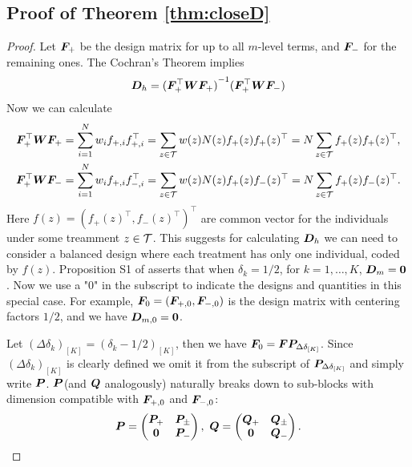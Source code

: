 \documentclass[12pt]{article}
\begin{document}
\subsection{Proof of Theorem \ref{thm:closeD}}
\begin{proof}
Let ${\boldsymbol{F}}_+$ be the design matrix for up to all $m$-level terms, and ${\boldsymbol{F}}_-$ for the remaining ones.  The Cochran's Theorem implies 
\begin{align*}
    {\boldsymbol{D}}_h = {({\boldsymbol{F}}_+^\top {\boldsymbol{W}} {\boldsymbol{F}}_+)}^{-1}({\boldsymbol{F}}_+^\top {\boldsymbol{W}} {\boldsymbol{F}}_-)
\end{align*}
Now we can calculate
\begin{align*}
    {\boldsymbol{F}}_+^\top {\boldsymbol{W}} {\boldsymbol{F}}_+ &= \sum_{i=1}^N w_i f_{+,i}f_{+,i}^\top = \sum_{z\in{\mathcal{T}}} w(z)N(z) f_+(z)f_+(z)^\top = N \sum_{z\in{\mathcal{T}}} f_+(z)f_+(z)^\top,\\
    {\boldsymbol{F}}_+^\top {\boldsymbol{W}} {\boldsymbol{F}}_- &= \sum_{i=1}^N w_i f_{+,i}f_{-,i}^\top = \sum_{z\in{\mathcal{T}}} w(z)N(z) f_+(z)f_-(z)^\top = N \sum_{z\in{\mathcal{T}}} f_+(z)f_-(z)^\top.
\end{align*}
Here $f(z)=(f_+(z)^\top, f_-(z)^\top)^\top$ are common vector for the individuals under some treamment $z\in{\mathcal{T}}$. This suggests for calculating ${\boldsymbol{D}}_h$ we can need to consider a balanced design where each treatment has only one individual, coded by $f(z)$.  Proposition S1 of \cite{zhao2021regression} asserts that when $\delta_k = 1/2$, for $k=1,\dots,K$, ${\boldsymbol{D}}_{m} = \boldsymbol{0}$. Now we use a "0" in the subscript to indicate the designs and quantities in this special case. For example, ${\boldsymbol{F}}_0 = ({\boldsymbol{F}}_{+,0}, {\boldsymbol{F}}_{-,0})$ is the design matrix with centering factors $1/2$, and we have ${\boldsymbol{D}}_{m,0}=\boldsymbol{0}$. 

Let $(\Delta\delta_k)_{[K]}=(\delta_k-1/2)_{[K]}$, then we have ${\boldsymbol{F}}_0={\boldsymbol{F}}{\boldsymbol{P}}_{\Delta\delta_{[K]}}$. Since $(\Delta\delta_k)_{[K]}$ is clearly defined we omit it from the subscript of ${\boldsymbol{P}}_{\Delta\delta_{[K]}}$ and simply write ${\boldsymbol{P}}$. ${\boldsymbol{P}}$(and ${\boldsymbol{Q}}$ analogously) naturally breaks down to sub-blocks with dimension compatible with ${\boldsymbol{F}}_{+,0}$ and ${\boldsymbol{F}}_{-,0}$:
\begin{align*}
    {\boldsymbol{P}} = \begin{pmatrix}
    {\boldsymbol{P}}_+ & {\boldsymbol{P}}_{\pm} \\
    \boldsymbol{0} & {\boldsymbol{P}}_{-} \\
    \end{pmatrix}, ~
    {\boldsymbol{Q}} = \begin{pmatrix}
    {\boldsymbol{Q}}_+ & {\boldsymbol{Q}}_{\pm} \\
    \boldsymbol{0} & {\boldsymbol{Q}}_{-} \\
    \end{pmatrix}.
\end{align*}



\end{proof}
\end{document}
